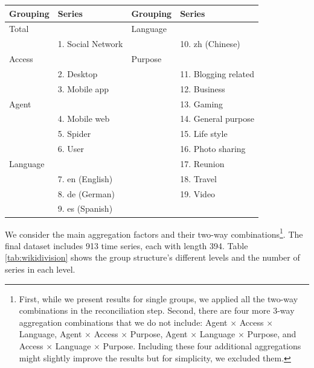 \documentclass[11pt,a4paper,]{article}
\let\origtable\table
\let\endorigtable\endtable
\renewenvironment{table}[1][2] {
    \expandafter\origtable\expandafter[!htbp]
} {
    \endorigtable
}
\begin{document}
\begin{table}

\caption{\label{tab:wikipediagroupingstructure}Social networking Wikipedia article grouping structure}
\centering
\begin{tabular}[t]{llll}
\toprule
Grouping & Series & Grouping & Series\\
\midrule
Total &  & Language & \\
 & 1. Social Network &  & 10. zh (Chinese)\\
Access &  & Purpose & \\
 & 2. Desktop &  & 11. Blogging related\\
 & 3. Mobile app &  & 12. Business\\
Agent &  &  & 13. Gaming\\
 & 4.  Mobile web &  & 14. General purpose\\
 & 5. Spider &  & 15. Life style\\
 & 6. User &  & 16. Photo sharing\\
Language &  &  & 17. Reunion\\
 & 7. en (English) &  & 18. Travel\\
 & 8. de (German) &  & 19. Video\\
 & 9. es (Spanish) &  & \\
\bottomrule
\end{tabular}
\end{table}

We consider the main aggregation factors and their two-way combinations\footnote{First, while we present results for single groups, we applied all the two-way combinations in the reconciliation step. Second, there are four more 3-way aggregation combinations that we do not include: Agent \(\times\) Access \(\times\) Language, Agent \(\times\) Access \(\times\) Purpose, Agent \(\times\) Language \(\times\) Purpose, and Access \(\times\) Language \(\times\) Purpose. Including these four additional aggregations might slightly improve the results but for simplicity, we excluded them.}. The final dataset includes 913 time series, each with length 394. Table \ref{tab:wikidivision} shows the group structure's different levels and the number of series in each level.
\end{document}
